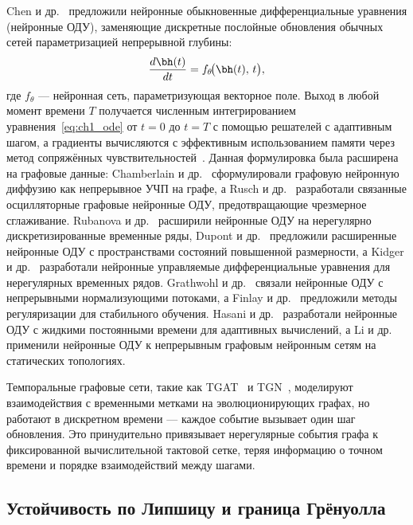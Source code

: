 Chen и др.~\cite{Chen2018} предложили нейронные обыкновенные дифференциальные уравнения (нейронные ОДУ), заменяющие дискретные послойные обновления обычных сетей параметризацией непрерывной глубины:
\begin{equation}
\frac{d\bh(t)}{dt} = f_\theta\!\bigl(\bh(t),\, t\bigr),
\label{eq:ch1_ode}
\end{equation}
где $f_\theta$ --- нейронная сеть, параметризующая векторное поле. Выход в любой момент времени $T$ получается численным интегрированием уравнения~\eqref{eq:ch1_ode} от $t=0$ до $t=T$ с помощью решателей с адаптивным шагом, а градиенты вычисляются с эффективным использованием памяти через метод сопряжённых чувствительностей~\cite{Pontryagin1962}. Данная формулировка была расширена на графовые данные: Chamberlain и др.~\cite{Chamberlain2021} сформулировали графовую нейронную диффузию как непрерывное УЧП на графе, а Rusch и др.~\cite{Rusch2022} разработали связанные осцилляторные графовые нейронные ОДУ, предотвращающие чрезмерное сглаживание. Rubanova и др.~\cite{Rubanova2019} расширили нейронные ОДУ на нерегулярно дискретизированные временные ряды, Dupont и др.~\cite{Dupont2019} предложили расширенные нейронные ОДУ с пространствами состояний повышенной размерности, а Kidger и др.~\cite{Kidger2020} разработали нейронные управляемые дифференциальные уравнения для нерегулярных временных рядов. Grathwohl и др.~\cite{Grathwohl2019} связали нейронные ОДУ с непрерывными нормализующими потоками, а Finlay и др.~\cite{Finlay2020} предложили методы регуляризации для стабильного обучения. Hasani и др.~\cite{Hasani2021} разработали нейронные ОДУ с жидкими постоянными времени для адаптивных вычислений, а Li и др.~\cite{Li2020ode} применили нейронные ОДУ к непрерывным графовым нейронным сетям на статических топологиях.

Темпоральные графовые сети, такие как TGAT~\cite{Xu2020tgat} и TGN~\cite{Rossi2020}, моделируют взаимодействия с временными метками на эволюционирующих графах, но работают в дискретном времени --- каждое событие вызывает один шаг обновления. Это принудительно привязывает нерегулярные события графа к фиксированной вычислительной тактовой сетке, теряя информацию о точном времени и порядке взаимодействий между шагами.


\subsection{Устойчивость по Липшицу и граница Грёнуолла}

